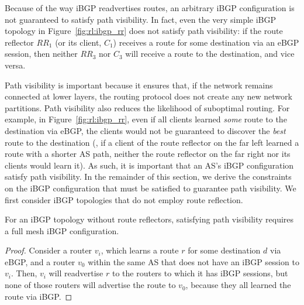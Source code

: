 Because of the way iBGP readvertises routes, an arbitrary iBGP
configuration is not guaranteed to satisfy path visibility.  In fact,
even the very 
simple iBGP topology in Figure~\ref{fig:rl:ibgp_rr} does not satisfy
path visibility: if the route reflector $RR_1$ (or its client, $C_1$)
receives a route for some destination via an eBGP session, then neither
$RR_3$ nor $C_3$ will receive a route to the destination, and vice
versa.  


Path visibility is important because it ensures that, if the network
remains connected at lower layers, the routing protocol does not create
any new network partitions.  Path visibility also reduces the likelihood of
suboptimal routing.  For example, in Figure~\ref{fig:rl:ibgp_rr}, even if
all clients learned {\em some} route to the destination via eBGP, the
clients would not be guaranteed to discover the {\em best} route to the
destination (\eg, if a client of the route reflector on the far left
learned a route with a shorter AS path, neither the route reflector on
the far right nor its clients would learn it).  As such, it is important
that an AS's iBGP configuration satisfy path visibility.  In the
remainder of this section, we derive the constraints on the iBGP
configuration that must be satisfied to guarantee path visibility.  We
first consider iBGP topologies that do not employ route reflection.


\begin{theorem}\label{th:mesh_visibility}
For an iBGP topology without route reflectors,
satisfying path visibility requires a full mesh iBGP configuration.
\end{theorem}

\begin{proof}
Consider a router $v_i$, which learns a route $r$ for some destination $d$ via
eBGP, and a router $v_0$ within the same AS that does not have an iBGP
session to $v_i$.  Then, $v_i$ will readvertise $r$ to the routers to which
it has iBGP sessions, but none of those routers will advertise the route
to $v_0$, because they all learned the route via iBGP.
\end{proof}




